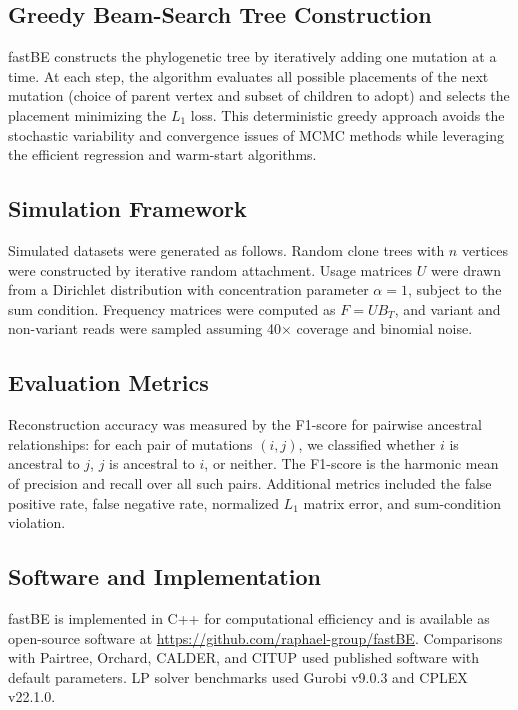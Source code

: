 \documentclass[11pt]{article}
\begin{document}
\subsection{Greedy Beam-Search Tree Construction}

fastBE constructs the phylogenetic tree by iteratively adding one mutation at a time. At each step, the algorithm evaluates all possible placements of the next mutation (choice of parent vertex and subset of children to adopt) and selects the placement minimizing the $L_1$ loss. This deterministic greedy approach avoids the stochastic variability and convergence issues of MCMC methods while leveraging the efficient regression and warm-start algorithms.

\subsection{Simulation Framework}

Simulated datasets were generated as follows. Random clone trees with $n$ vertices were constructed by iterative random attachment. Usage matrices $U$ were drawn from a Dirichlet distribution with concentration parameter $\alpha = 1$, subject to the sum condition. Frequency matrices were computed as $F = UB_T$, and variant and non-variant reads were sampled assuming 40$\times$ coverage and binomial noise.

\subsection{Evaluation Metrics}

Reconstruction accuracy was measured by the F1-score for pairwise ancestral relationships: for each pair of mutations $(i, j)$, we classified whether $i$ is ancestral to $j$, $j$ is ancestral to $i$, or neither. The F1-score is the harmonic mean of precision and recall over all such pairs. Additional metrics included the false positive rate, false negative rate, normalized $L_1$ matrix error, and sum-condition violation.

\subsection{Software and Implementation}

fastBE is implemented in C++ for computational efficiency and is available as open-source software at \url{https://github.com/raphael-group/fastBE}. Comparisons with Pairtree, Orchard, CALDER, and CITUP used published software with default parameters. LP solver benchmarks used Gurobi v9.0.3 and CPLEX v22.1.0.
\end{document}
